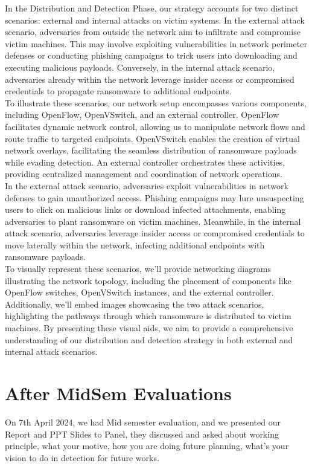 \documentclass[12pt,twocolumn]{article}
\begin{document}
In the Distribution and Detection Phase, our strategy accounts for two distinct scenarios: external and internal attacks on victim systems. In the external attack scenario, adversaries from outside the network aim to infiltrate and compromise victim machines. This may involve exploiting vulnerabilities in network perimeter defenses or conducting phishing campaigns to trick users into downloading and executing malicious payloads. Conversely, in the internal attack scenario, adversaries already within the network leverage insider access or compromised credentials to propagate ransomware to additional endpoints.
\\
To illustrate these scenarios, our network setup encompasses various components, including OpenFlow, OpenVSwitch, and an external controller. OpenFlow facilitates dynamic network control, allowing us to manipulate network flows and route traffic to targeted endpoints. OpenVSwitch enables the creation of virtual network overlays, facilitating the seamless distribution of ransomware payloads while evading detection. An external controller orchestrates these activities, providing centralized management and coordination of network operations.
\\
In the external attack scenario, adversaries exploit vulnerabilities in network defenses to gain unauthorized access. Phishing campaigns may lure unsuspecting users to click on malicious links or download infected attachments, enabling adversaries to plant ransomware on victim machines. Meanwhile, in the internal attack scenario, adversaries leverage insider access or compromised credentials to move laterally within the network, infecting additional endpoints with ransomware payloads.
\\
To visually represent these scenarios, we'll provide networking diagrams illustrating the network topology, including the placement of components like OpenFlow switches, OpenVSwitch instances, and the external controller. Additionally, we'll embed images showcasing the two attack scenarios, highlighting the pathways through which ransomware is distributed to victim machines. By presenting these visual aids, we aim to provide a comprehensive understanding of our distribution and detection strategy in both external and internal attack scenarios.

\section{After MidSem Evaluations}
On 7th April 2024, we had Mid semester evaluation, and we presented our Report and PPT Slides to Panel, they discussed and asked about working principle, what your motive, how you are doing future planning, what's your vision to do in detection for future works.
\end{document}
